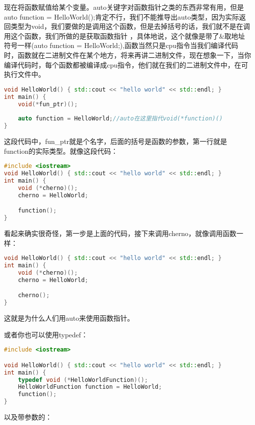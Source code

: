 现在将函数赋值给某个变量。auto关键字对函数指针之类的东西非常有用，但是{\ncodestyle auto function = HelloWorld();}肯定不行，我们不能推导出{\ncodestyle auto}类型，因为实际返回类型为{\ncodestyle void}，我们要做的是调用这个函数，但是去掉括号的话，我们就不是在调用这个函数，我们所做的是获取函数指针 ，具体地说，这个就像是带了\&取地址符号一样({\ncodestyle auto function = HelloWorld;}),函数当然只是cpu指令当我们编译代码时，函数就在二进制文件在某个地方，将来再讲二进制文件，现在想象一下，当你编译代码时，每个函数都被编译成cpu指令，他们就在我们的二进制文件中，在可执行文件中。

\begin{lstlisting}[language=c++]
void HelloWorld() { std::cout << "hello world" << std::endl; }
int main() {
    void(*fun_ptr)();
    
    auto function = HelloWorld;//auto在这里指代void(*function)()
}
\end{lstlisting}

这段代码中，{\ncodestyle fun_ptr}就是个名字，后面的括号是函数的参数，第一行就是{\ncodestyle function}的实际类型。就像这段代码：

\begin{lstlisting}[language=c++]
#include <iostream>
void HelloWorld() { std::cout << "hello world" << std::endl; }
int main() {
    void (*cherno)();
    cherno = HelloWorld;

    function();
}
\end{lstlisting}

看起来确实很奇怪，第一步是上面的代码，接下来调用cherno，就像调用函数一样：

\begin{lstlisting}[language=c++]
void HelloWorld() { std::cout << "hello world" << std::endl; }
int main() {
    void (*cherno)();
    cherno = HelloWorld;

    cherno();
}
\end{lstlisting}

这就是为什么人们用{\ncodestyle auto}来使用函数指针。

或者你也可以使用{\ncodestyle typedef}：

\begin{lstlisting}[language=c++]
#include <iostream>

void HelloWorld() { std::cout << "hello world" << std::endl; }
int main() {
    typedef void (*HelloWorldFunction)();
    HelloWorldFunction function = HelloWorld;
    function();
}
\end{lstlisting}

以及带参数的：

